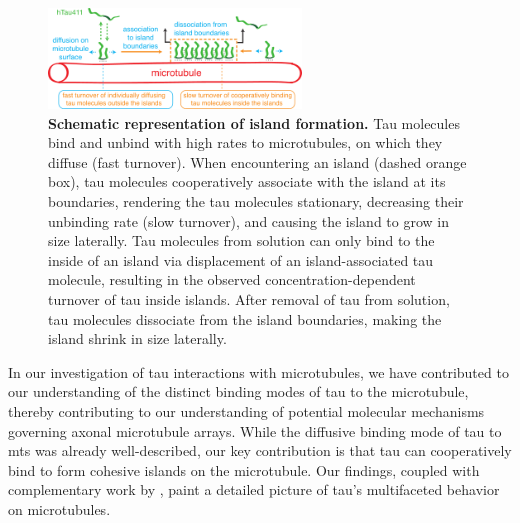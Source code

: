 \begin{figure}[h!tb]
\centering
\includegraphics[width=0.6\textwidth]{Figures/tau8.png}
\caption[Schematic representation of island formation.]{
\textbf{Schematic representation of island formation.} Tau molecules bind and unbind with high rates to microtubules, on which they diffuse (fast turnover). When encountering an island (dashed orange box), tau molecules cooperatively associate with the island at its boundaries, rendering the tau molecules stationary, decreasing their unbinding rate (slow turnover), and causing the island to grow in size laterally. Tau molecules from solution can only bind to the inside of an island via displacement of an island-associated tau molecule, resulting in the observed concentration-dependent turnover of tau inside islands. After removal of tau from solution, tau molecules dissociate from the island boundaries, making the island shrink in size laterally.
	}\label{tau8}
\end{figure}
In our investigation of tau interactions with microtubules, we have contributed to our understanding of the distinct binding modes of tau to the microtubule, thereby contributing to our understanding of potential molecular mechanisms governing axonal microtubule arrays. While the diffusive binding mode of tau to mts was already well-described, our key contribution is that tau can cooperatively bind to form cohesive islands on the microtubule. Our findings, coupled with complementary work by \cite{tan2019microtubules}, paint a detailed picture of tau's multifaceted behavior on microtubules.\par

